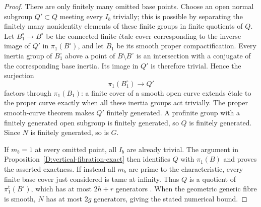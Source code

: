 \begin{proof}
There are only finitely many omitted base points.  Choose an
open normal subgroup $Q'\subset Q$ meeting every $I_b$ trivially;
this is possible by separating the finitely many nonidentity
elements of these finite groups in finite quotients of $Q$.
Let $B_1^\circ\to B^\circ$ be the connected finite \'etale cover
corresponding to the inverse image of $Q'$ in $\pi_1(B^\circ)$,
and let $B_1$ be its smooth proper compactification.  Every
inertia group of $B_1^\circ$ above a point of
$B\setminus B^\circ$ is an intersection with a conjugate of the
corresponding base inertia.  Its image in $Q'$ is therefore
trivial.  Hence the surjection
\[
                  \pi_1(B_1^\circ)\longrightarrow Q'
\]
factors through $\pi_1(B_1)$: a finite cover of a smooth open
curve extends \'etale to the proper curve exactly when all
these inertia groups act trivially.  The proper smooth-curve
theorem makes $Q'$ finitely generated.  A profinite group with
a finitely generated open subgroup is finitely generated, so
$Q$ is finitely generated.  Since $N$ is finitely generated,
so is $G$.

If $m_b=1$ at every omitted point, all $I_b$ are already
trivial.  The argument in
Proposition~\ref{D:vertical-fibration-exact} then identifies
$Q$ with $\pi_1(B)$ and proves the asserted exactness.
If instead all $m_b$ are prime to the characteristic, every
finite base cover just considered is tame at infinity.
Thus $Q$ is a quotient of $\pi_1^{\mathrm t}(B^\circ)$, which
has at most $2h+r$ generators
\cite[XIII, Corollary 2.12, pp. 392--393]{SGA1}.
When the geometric generic fibre is smooth, $N$ has at most
$2g$ generators, giving the stated numerical bound.
\end{proof}

